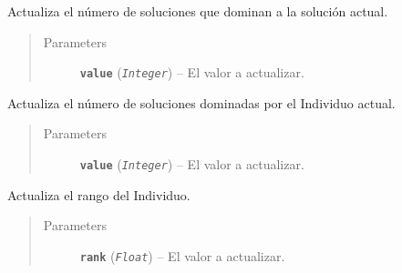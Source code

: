 \documentclass[letterpaper,10pt,english]{sphinxmanual}
\begin{document}
\begin{fulllineitems}
\begin{fulllineitems}
\begin{quote}
\begin{description}
\end{description}\end{quote}

\end{fulllineitems}


\begin{fulllineitems}
\label{Model/Community/Population/Individual/Individual:Model.Community.Population.Individual.Individual.Individual.set_pareto_dominated}
Actualiza el número de soluciones que dominan a la
solución actual.
\begin{quote}\begin{description}
\item[{Parameters}] \leavevmode
\textbf{\texttt{value}} (\emph{\texttt{Integer}}) -- El valor a actualizar.

\end{description}\end{quote}

\end{fulllineitems}


\begin{fulllineitems}
\label{Model/Community/Population/Individual/Individual:Model.Community.Population.Individual.Individual.Individual.set_pareto_dominates}
Actualiza el número de soluciones dominadas por el
Individuo actual.
\begin{quote}\begin{description}
\item[{Parameters}] \leavevmode
\textbf{\texttt{value}} (\emph{\texttt{Integer}}) -- El valor a actualizar.

\end{description}\end{quote}

\end{fulllineitems}


\begin{fulllineitems}
\label{Model/Community/Population/Individual/Individual:Model.Community.Population.Individual.Individual.Individual.set_rank}
Actualiza el rango del Individuo.
\begin{quote}\begin{description}
\item[{Parameters}] \leavevmode
\textbf{\texttt{rank}} (\emph{\texttt{Float}}) -- El valor a actualizar.

\end{description}\end{quote}

\end{fulllineitems}


\end{fulllineitems}
\end{document}
